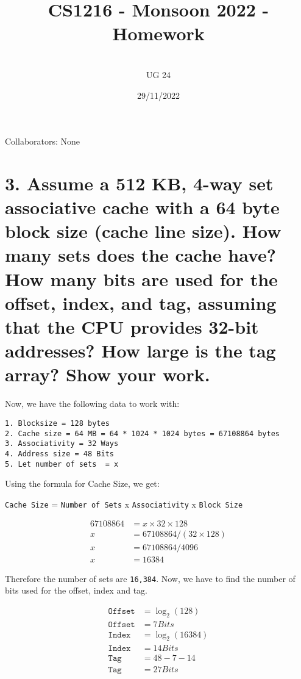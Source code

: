 \documentclass[11pt]{article}
\title{CS1216 - Monsoon 2022 - Homework \Homework}
\author{\Name 
\\UG 24 \SID
}
\date{29/11/2022}
\begin{document}
\maketitle

Collaborators: None

\section*{3. Assume a 512 KB, 4-way set associative cache with a 64 byte block size (cache line size). How many sets does the cache have? How many bits are used for the offset, index, and tag, assuming that the CPU provides 32-bit addresses? How large is the tag array? Show your work.}

Now, we have the following data to work with:
\begin{verbatim}
1. Blocksize = 128 bytes
2. Cache size = 64 MB = 64 * 1024 * 1024 bytes = 67108864 bytes
3. Associativity = 32 Ways
4. Address size = 48 Bits
5. Let number of sets  = x
\end{verbatim}

Using the formula for Cache Size, we get:

\texttt{Cache Size} = \texttt{Number of Sets} x \texttt{Associativity} x \texttt{Block Size}

\begin{equation}
\begin{split}
67108864 &= x \times 32 \times 128 \\
x &= 67108864 / (32 \times 128) \\
x &= 67108864 / 4096 \\
x &= 16384
\end{split}
\end{equation}

Therefore the number of sets are \texttt{16,384}.
Now, we have to find the number of bits used for the offset, index and tag.

\begin{equation}
\begin{split}
\texttt{Offset} &= \log_2(128) \\
\texttt{Offset} &= 7 Bits\\
\texttt{Index} &= \log_2(16384) \\
\texttt{Index} &= 14 Bits\\
\texttt{Tag} &= 48 - 7 - 14 \\
\texttt{Tag} &= 27 Bits
\end{split}
\end{equation}
    
\end{document}
